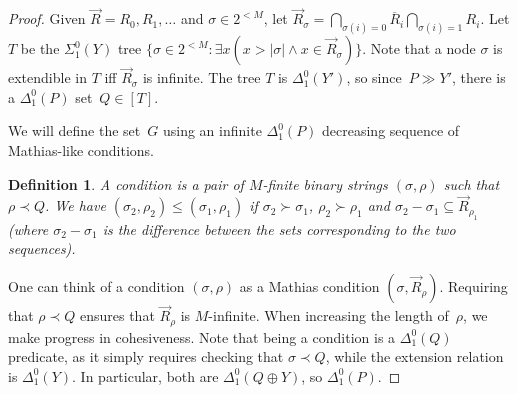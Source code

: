 \documentclass{article}
\numberwithin{theorem}{section}
\newtheorem{proposition}[theorem]{Proposition}
\newtheorem{definition}[theorem]{Definition}
\newcommand{\RCA}{\mathsf{RCA}}
\newcommand{\BSig}{\mathsf{B}\Sigma^0}
\newcommand{\WF}{\mathsf{WF}}
\newcommand{\M}{\mathcal{M}}
\begin{document}
\begin{proof}
Given $\vec{R} = R_0, R_1, \dots$ and $\sigma \in 2^{<M}$, let $\vec{R}_\sigma = \bigcap_{\sigma(i) = 0} \overline{R}_i \bigcap_{\sigma(i) = 1} R_i$. Let $T$ be the $\Sigma^0_1(Y)$ tree $\{ \sigma \in 2^{<M} : \exists x (x > |\sigma| \wedge x \in \vec{R}_\sigma) \}$. Note that a node $\sigma$ is extendible in $T$ iff $\vec{R}_\sigma$ is infinite. The tree %
$T$ is $\Delta^0_1(Y')$, so since~$P \gg Y'$, there is a $\Delta^0_1(P)$ set~$Q \in [T]$. %

We will define the set~$G$ using an infinite $\Delta^0_1(P)$ decreasing sequence of Mathias-like conditions. 

\begin{definition}
A \emph{condition} is a pair of $M$-finite binary strings $(\sigma,\rho)$ such that $\rho \prec Q$.
We have $(\sigma_2,\rho_2) \leq (\sigma_1,\rho_1)$ if $\sigma_2 \succ \sigma_1$, $\rho_2 \succ \rho_1$ and $\sigma_2 - \sigma_1 \subseteq \vec{R}_{\rho_1}$ (where $\sigma_2 - \sigma_1$ is the difference between the sets corresponding to the two sequences).
\end{definition}

One can think of a condition $(\sigma, \rho)$ as a Mathias condition $(\sigma, \vec{R}_\rho)$. Requiring that $\rho \prec Q$ ensures that $\vec{R}_\rho$ is $M$-infinite. When increasing the length of~$\rho$, we make progress in cohesiveness.
Note that being a condition is a $\Delta^0_1(Q)$ predicate, as it simply requires checking that $\sigma \prec Q$, while the extension relation is $\Delta^0_1(Y)$. In particular, both are $\Delta^0_1(Q \oplus Y)$, so $\Delta^0_1(P)$.


\end{proof}
\end{document}
